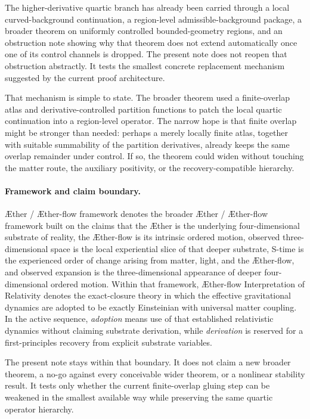 \documentclass[11pt]{article}
\newcommand{\Aether}{\AE{}ther}
\newcommand{\Aflow}{\AE{}ther-flow}
\newcommand{\TheoryName}{\Aflow{} Interpretation of Relativity}
\newcommand{\TheoryProgram}{\Aether{} / \Aflow{} framework}
\begin{document}
The higher-derivative quartic branch has already been carried through a local curved-background continuation, a region-level admissible-background package, a broader theorem on uniformly controlled bounded-geometry regions, and an obstruction note showing why that theorem does not extend automatically once one of its control channels is dropped. The present note does not reopen that obstruction abstractly. It tests the smallest concrete replacement mechanism suggested by the current proof architecture.

That mechanism is simple to state. The broader theorem used a finite-overlap atlas and derivative-controlled partition functions to patch the local quartic continuation into a region-level operator. The narrow hope is that finite overlap might be stronger than needed: perhaps a merely locally finite atlas, together with suitable summability of the partition derivatives, already keeps the same overlap remainder under control. If so, the theorem could widen without touching the matter route, the auxiliary positivity, or the recovery-compatible hierarchy.

\paragraph{Framework and claim boundary.}
\TheoryProgram{} denotes the broader \Aether{} / \Aflow{} framework built on the claims that the \Aether{} is the underlying four-dimensional substrate of reality, the \Aflow{} is its intrinsic ordered motion, observed three-dimensional space is the local experiential slice of that deeper substrate, S-time is the experienced order of change arising from matter, light, and the \Aflow{}, and observed expansion is the three-dimensional appearance of deeper four-dimensional ordered motion. Within that framework, \TheoryName{} denotes the exact-closure theory in which the effective gravitational dynamics are adopted to be exactly Einsteinian with universal matter coupling. In the active sequence, \emph{adoption} means use of that established relativistic dynamics without claiming substrate derivation, while \emph{derivation} is reserved for a first-principles recovery from explicit substrate variables.

The present note stays within that boundary. It does not claim a new broader theorem, a no-go against every conceivable wider theorem, or a nonlinear stability result. It tests only whether the current finite-overlap gluing step can be weakened in the smallest available way while preserving the same quartic operator hierarchy.
\end{document}
